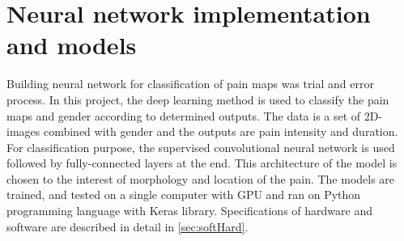 \section{Neural network implementation and models}
Building neural network for classification of pain maps was trial and error process.
In this project, the deep learning method is used to classify the pain maps and gender according to determined outputs. The data is a set of 2D-images combined with gender and the outputs are pain intensity and duration. For classification purpose, the supervised convolutional neural network is used followed by fully-connected layers at the end. This architecture of the model is chosen to the interest of morphology and location of the pain. The models are trained, and tested on a single computer with GPU and ran on Python programming language with Keras library. Specifications of hardware and software are described in detail in \autoref{sec:softHard}.


